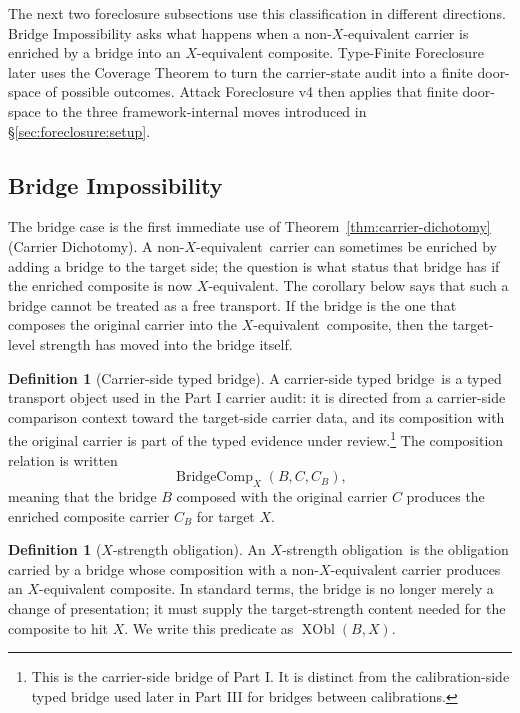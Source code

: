 \documentclass[11pt]{article}
\newcommand{\Xequiv}{$X$-equivalent}
\newcommand{\nonXequiv}{non-$X$-equivalent}
\newcommand{\XstrengthObl}{$X$-strength obligation}
\newcommand{\thmCarrierDichotomy}{Theorem~\ref{thm:carrier-dichotomy} (Carrier Dichotomy)}
\newcommand{\TypedBridgeCarrier}{carrier-side typed bridge}
\theoremstyle{definition}
\newtheorem{definition}[theorem]{Definition}
\begin{document}
The next two foreclosure subsections use this classification in
different directions.  Bridge Impossibility asks what happens when a
non-\(X\)-equivalent carrier is enriched by a bridge into an
\(X\)-equivalent composite.  Type-Finite Foreclosure later uses the
Coverage Theorem to turn the carrier-state audit into a finite
door-space of possible outcomes.  Attack Foreclosure v4 then applies
that finite door-space to the three framework-internal moves introduced in
\S\ref{sec:foreclosure:setup}.

\subsection{Bridge Impossibility}\label{sec:foreclosure:bridge-impossibility}

The bridge case is the first immediate use of
\thmCarrierDichotomy.  A \nonXequiv\ carrier can sometimes be enriched
by adding a bridge to the target side; the question is what status that
bridge has if the enriched composite is now \Xequiv.  The corollary
below says that such a bridge cannot be treated as a free transport.
If the bridge is the one that composes the original carrier into the
\Xequiv\ composite, then the target-level strength has moved into the
bridge itself.

\begin{definition}[Carrier-side typed bridge]\label{def:carrier-side-typed-bridge}
A \TypedBridgeCarrier\ is a typed transport object used in the Part I
carrier audit: it is directed from a carrier-side comparison context
toward the target-side carrier data, and its composition with the
original carrier is part of the typed evidence under review.\footnote{This
is the carrier-side bridge of Part I.  It is distinct from the
calibration-side typed bridge used later in Part III for bridges
between calibrations.}
The composition relation is written
\[
  \operatorname{BridgeComp}_X(B,C,C_B),
\]
meaning that the bridge \(B\) composed with the original carrier \(C\)
produces the enriched composite carrier \(C_B\) for target \(X\).
\end{definition}

\begin{definition}[\(X\)-strength obligation]\label{def:x-strength-obligation}
An \XstrengthObl\ is the obligation carried by a bridge whose
composition with a non-\(X\)-equivalent carrier produces an
\(X\)-equivalent composite.  In standard terms, the bridge is no longer
merely a change of presentation; it must supply the target-strength
content needed for the composite to hit \(X\).
We write this predicate as \(\operatorname{XObl}(B,X)\).
\end{definition}
\end{document}
